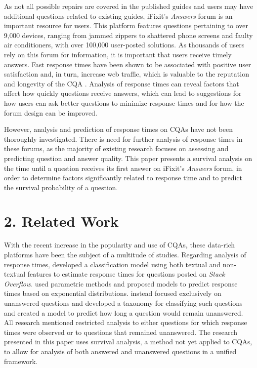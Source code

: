 \documentclass{article}
\begin{document}
As not all possible repairs are covered in the published guides and users may have additional questions related to existing guides, iFixit's \textit{Answers} forum is an important resource for users. This platform features questions pertaining to over 9,000 devices, ranging from jammed zippers to shattered phone screens and faulty air conditioners, with over 100,000 user-posted solutions. As thousands of users rely on this forum for information, it is important that users receive timely answers. Fast response times have been shown to be associated with positive user satisfaction and, in turn, increase web traffic, which is valuable to the reputation and longevity of the CQA \cite{Rechavi2011}. Analysis of response times can reveal factors that affect how quickly questions receive answers, which can lead to suggestions for how users can ask better questions to minimize response times and for how the forum design can be improved.

However, analysis and prediction of response times on CQAs have not been thoroughly investigated. There is need for further analysis of response times in these forums, as the majority of existing research focuses on assessing and predicting question and answer quality. This paper presents a survival analysis on the time until a question receives its first answer on iFixit's \textit{Answers} forum, in order to determine factors significantly related to response time and to predict the survival probability of a question.


\section*{2. Related Work}
  
With the recent increase in the popularity and use of CQAs, these data-rich platforms have been the subject of a multitude of studies. Regarding analysis of response times, \cite{Bhat2014} developed a classification model using both textual and non-textual features to estimate response times for questions posted on \textit{Stack Overflow}. \cite{Mahmud2013} used parametric methods and proposed models to predict response times based on exponential distributions. \cite{Asaduzzaman2013} instead focused exclusively on unanswered questions and developed a taxonomy for classifying such questions and created a model to predict how long a question would remain unanswered. All research mentioned restricted analysis to either questions for which response times were observed or to questions that remained unanswered. The research presented in this paper uses survival analysis, a method not yet applied to CQAs, to allow for analysis of both answered and unanswered questions in a unified framework. 
\end{document}
